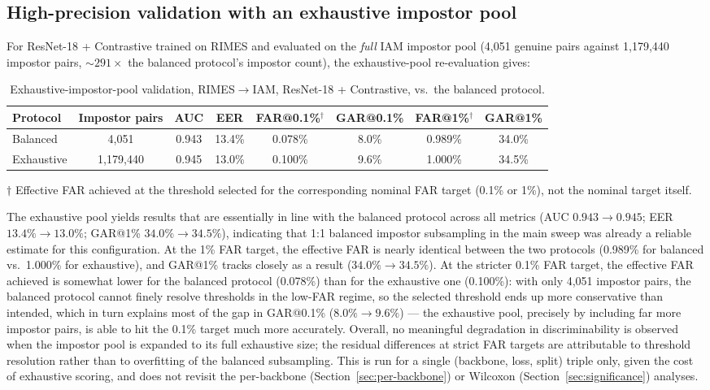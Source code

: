 \subsection{High-precision validation with an exhaustive impostor pool}
\label{sec:exhaustive}

For ResNet-18 + Contrastive trained on RIMES and evaluated on the
\emph{full} IAM impostor pool (4{,}051 genuine pairs against
1{,}179{,}440 impostor pairs, $\sim\!291\times$ the balanced
protocol's impostor count), the exhaustive-pool re-evaluation gives:

\begin{table}[htbp]
\centering
\caption{Exhaustive-impostor-pool validation, RIMES$\to$IAM,
  ResNet-18 + Contrastive, vs.\ the balanced protocol.}
\label{tab:exhaustive}
\small
\begin{tabular}{lccccccc}
\toprule
    Protocol & Impostor pairs & AUC & EER & FAR@0.1\%$^\dagger$ & GAR@0.1\% & FAR@1\%$^\dagger$ & GAR@1\% \\
\midrule
    Balanced   & 4{,}051       & 0.943 & 13.4\% & 0.078\% & 8.0\% & 0.989\% & 34.0\% \\
    Exhaustive & 1{,}179{,}440 & 0.945 & 13.0\% & 0.100\% & 9.6\% & 1.000\% & 34.5\% \\
\bottomrule
\end{tabular}
\begin{tablenotes}
\footnotesize
\item[$\dagger$] Effective FAR achieved at the threshold selected for the corresponding
  nominal FAR target (0.1\% or 1\%), not the nominal target itself.
\end{tablenotes}
\end{table}

The exhaustive pool yields results that are essentially in line with
the balanced protocol across all metrics (AUC $0.943\to0.945$; EER
$13.4\%\to13.0\%$; GAR@1\% $34.0\%\to34.5\%$), indicating that 1:1
balanced impostor subsampling in the main sweep was already a
reliable estimate for this configuration. At the 1\% FAR target, the
effective FAR is nearly identical between the two protocols
(0.989\% for balanced vs.\ 1.000\% for exhaustive), and GAR@1\%
tracks closely as a result ($34.0\%\to34.5\%$). At the stricter
0.1\% FAR target, the effective FAR achieved is somewhat lower for
the balanced protocol (0.078\%) than for the exhaustive one
(0.100\%): with only 4{,}051 impostor pairs, the balanced protocol
cannot finely resolve thresholds in the low-FAR regime, so the
selected threshold ends up more conservative than intended, which in
turn explains most of the gap in GAR@0.1\% ($8.0\%\to9.6\%$) — the
exhaustive pool, precisely by including far more impostor pairs, is
able to hit the 0.1\% target much more accurately. Overall, no
meaningful degradation in discriminability is observed when the
impostor pool is expanded to its full exhaustive size; the residual
differences at strict FAR targets are attributable to threshold
resolution rather than to overfitting of the balanced subsampling.
This is run for a single (backbone, loss, split) triple only, given
the cost of exhaustive scoring, and does not revisit the
per-backbone (Section~\ref{sec:per-backbone}) or Wilcoxon
(Section~\ref{sec:significance}) analyses.

